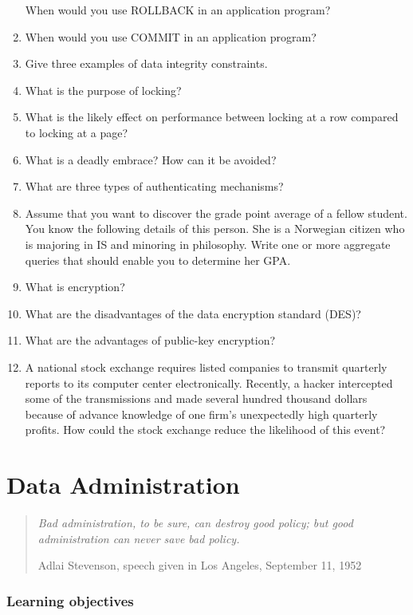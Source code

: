 \documentclass[
]{article}
\begin{document}
\begin{enumerate}
  When would you use ROLLBACK in an application program?
\item
  When would you use COMMIT in an application program?
\item
  Give three examples of data integrity constraints.
\item
  What is the purpose of locking?
\item
  What is the likely effect on performance between locking at a row
  compared to locking at a page?
\item
  What is a deadly embrace? How can it be avoided?
\item
  What are three types of authenticating mechanisms?
\item
  Assume that you want to discover the grade point average of a fellow
  student. You know the following details of this person. She is a
  Norwegian citizen who is majoring in IS and minoring in philosophy.
  Write one or more aggregate queries that should enable you to
  determine her GPA.
\item
  What is encryption?
\item
  What are the disadvantages of the data encryption standard (DES)?
\item
  What are the advantages of public-key encryption?
\item
  A national stock exchange requires listed companies to transmit
  quarterly reports to its computer center electronically. Recently, a
  hacker intercepted some of the transmissions and made several
  hundred thousand dollars because of advance knowledge of one firm's
  unexpectedly high quarterly profits. How could the stock exchange
  reduce the likelihood of this event?
\end{enumerate}

\hypertarget{data-administration}{%
\section{Data Administration}\label{data-administration}}

\begin{quote}
\emph{Bad administration, to be sure, can destroy good policy; but good
administration can never save bad policy.}

Adlai Stevenson, speech given in Los Angeles, September 11, 1952
\end{quote}

\hypertarget{learning-objectives-15}{%
\subsubsection*{Learning objectives}\label{learning-objectives-15}}
\end{document}
